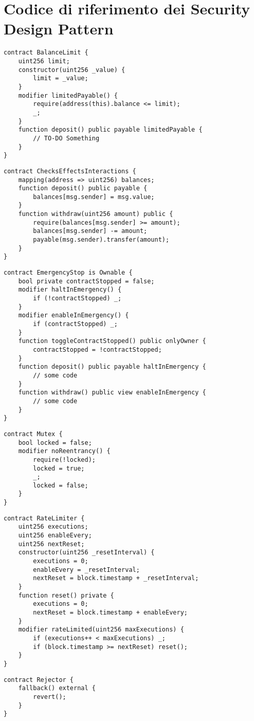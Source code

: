 {\section{Codice di riferimento dei Security Design Pattern}

{\label{appendix:balance_limit}\begin{lstlisting}[language=Solidity, caption={Codice di riferimento per Balance Limit}]
contract BalanceLimit {
	uint256 limit;
	constructor(uint256 _value) {
		limit = _value;
	}
	modifier limitedPayable() {
		require(address(this).balance <= limit);
		_;
	}
	function deposit() public payable limitedPayable {
		// TO-DO Something
	}
}
\end{lstlisting}}

{\label{appendix:check_effects_interactions}\begin{lstlisting}[language=Solidity, caption={Codice di riferimento per Check Effects Interactions}]
contract ChecksEffectsInteractions {
	mapping(address => uint256) balances;
	function deposit() public payable {
		balances[msg.sender] = msg.value;
	}
	function withdraw(uint256 amount) public {
		require(balances[msg.sender] >= amount);
		balances[msg.sender] -= amount;
		payable(msg.sender).transfer(amount);
	}
}
\end{lstlisting}}

\label{appendix:emergency_stop}{\begin{lstlisting}[language=Solidity, caption={Codice di riferimento per Emergency Stop}]
contract EmergencyStop is Ownable {
	bool private contractStopped = false;
	modifier haltInEmergency() {
		if (!contractStopped) _;
	}
	modifier enableInEmergency() {
		if (contractStopped) _;
	}
	function toggleContractStopped() public onlyOwner {
		contractStopped = !contractStopped;
	}
	function deposit() public payable haltInEmergency {
		// some code
	}
	function withdraw() public view enableInEmergency {
		// some code
	}
}
\end{lstlisting}}
\newpage
{\label{appendix:mutex}\begin{lstlisting}[language=Solidity, caption={Codice di riferimento per Mutex}]
contract Mutex {
	bool locked = false;
	modifier noReentrancy() {
		require(!locked);
		locked = true;
		_;
		locked = false;
	}
}
\end{lstlisting}}

{\label{appendix:rate_limit}\begin{lstlisting}[language=Solidity, caption={Codice di riferimento per Rate Limit}]
contract RateLimiter {
	uint256 executions;
	uint256 enableEvery;
	uint256 nextReset;
	constructor(uint256 _resetInterval) {
		executions = 0;
		enableEvery = _resetInterval;
		nextReset = block.timestamp + _resetInterval;
	}
	function reset() private {
		executions = 0;
		nextReset = block.timestamp + enableEvery;
	}
	modifier rateLimited(uint256 maxExecutions) {
		if (executions++ < maxExecutions) _;
		if (block.timestamp >= nextReset) reset();
	}
}
\end{lstlisting}}

{\label{appendix:rejector}\begin{lstlisting}[language=Solidity, caption={Codice di riferimento per Rejector}]
contract Rejector {
	fallback() external {
		revert();
	}
}
\end{lstlisting}}
}
\newpage
